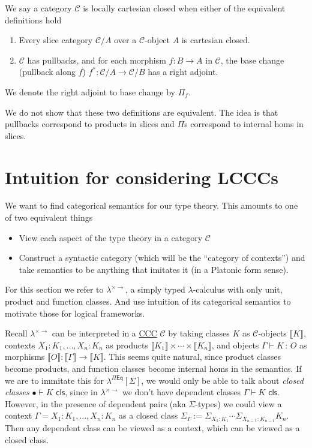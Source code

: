 \documentclass{article}
\newcommand{\STLC}{\la^{\times \to}}
\newcommand{\LF}[1]{\la^{\Pi \mathsf{Eq}}[#1]}
\newcommand{\tdt}{\times \cdots \times}
\newcommand{\bbrkt}[1]{\llbracket #1 \rrbracket}
\newcommand{\CtxExt}[3]{#1,#2 : #3}
\newcommand{\ClsJdg}[2]{#1 \vdash #2 \,\, \mathsf{cls}}
\newcommand{\ObjJdg}[3]{#1 \vdash #2 \, : \, #3 }
\newcommand{\<}{\langle}
\renewcommand{\>}{\rangle}
\newcommand{\la}{\lambda}
\newcommand{\Ga}{\Gamma}
\newcommand{\Si}{\Sigma}
\newcommand{\CC}{\mathcal{C}}
\newcommand{\linkto}[2]{\hyperlink{#1}{#2}}
\theoremstyle{definitionstyle}
\theoremstyle{exercisestyle}
\theoremstyle{remarkstyle}
\begin{document}
\begin{dfn}
  We say a category $\CC$ is locally cartesian closed when either of the equivalent definitions hold
  \begin{enumerate}
    \item Every slice category $\CC / A$ over a $\CC$-object $A$ is cartesian closed.
    \item $\CC$ has pullbacks, and for each morphism $f : B \to A$ in $\CC$,
          the base change (pullback along $f$) $f^{*} : \CC / A \to \CC / B$ has a right adjoint.
  \end{enumerate}
  We denote the right adjoint to base change by $\Pi_{f}$.
\end{dfn}

We do not show that these two definitions are equivalent.
The idea is that pullbacks correspond to products in slices
and $\Pi$s correspond to internal homs in slices.

\section{Intuition for considering LCCCs}

We want to find categorical semantics for our type theory.
This amounts to one of two equivalent things
\begin{itemize}
  \item View each aspect of the type theory in a category $\CC$
  \item Construct a syntactic category (which will be the ``category of contexts'')
        and take semantics to be anything that imitates it (in a Platonic form sense).
\end{itemize}

For this section we refer to $\STLC$,
a simply typed $\la$-calculus with only unit, product and function classes.
And use intuition of its categorical semantics to motivate those for logical frameworks.

Recall $\STLC$ can be interpreted in a \linkto{dfn_CCC}{CCC} $\CC$ by
taking classes $K$ as $\CC$-objects $\bbrkt{K}$,
contexts $\CtxExt{X_{1}:K_{1},\dots}{X_{n}}{K_{n}}$
as products $\bbrkt{K_{1}} \tdt \bbrkt{K_{n}}$,
and objects $\ObjJdg{\Ga}{K}{O}$ as morphisms $\bbrkt{O} : \bbrkt{\Ga} \to \bbrkt{K}$. %
This seems quite natural, since product classes become products,
and function classes become internal homs in the semantics.
If we are to immitate this for $\LF{\Si}$,
we would only be able to talk about \textit{closed classes} $\ClsJdg{\bullet}{K}$,
since in $\STLC$ we don't have dependent classes $\ClsJdg{\Ga}{K}$.
However, in the presence of dependent pairs (aka $\Si$-types) we
could view a context $\Ga = \CtxExt{X_{1}:K_{1},\dots}{X_{n}}{K_{n}}$
as a closed class $\Si_{\Ga} := \Si_{X_{1}:K_{1}} \cdots \Si_{X_{n-1}:K_{n-1}} K_{n}$.
Then any dependent class can be viewed as a context, which can be viewed as a closed class.
\end{document}
